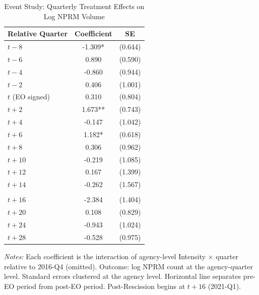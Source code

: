 \begin{table}[t]
\centering
\caption{Event Study: Quarterly Treatment Effects on Log NPRM Volume}
\label{tab:event}
\begin{threeparttable}
\begin{tabular}{lcc}
\hline\hline
Relative Quarter & Coefficient & SE \\
\hline
$t-8$ & -1.309* & (0.644) \\
$t-6$ & 0.890 & (0.590) \\
$t-4$ & -0.860 & (0.944) \\
$t-2$ & 0.406 & (1.001) \\
\hline
$t$ (EO signed) & 0.310 & (0.804) \\
$t+2$ & 1.673** & (0.743) \\
$t+4$ & -0.147 & (1.042) \\
$t+6$ & 1.182* & (0.618) \\
$t+8$ & 0.306 & (0.962) \\
$t+10$ & -0.219 & (1.085) \\
$t+12$ & 0.167 & (1.399) \\
$t+14$ & -0.262 & (1.567) \\
\addlinespace
\multicolumn{3}{l}{\textit{Post-Rescission (2021+):}} \\
$t+16$ & -2.384 & (1.404) \\
$t+20$ & 0.108 & (0.829) \\
$t+24$ & -0.943 & (1.024) \\
$t+28$ & -0.528 & (0.975) \\
\hline\hline
\end{tabular}
\begin{tablenotes}[flushleft]\small
\item \textit{Notes:} Each coefficient is the interaction of agency-level Intensity $\times$ quarter relative to 2016-Q4 (omitted). Outcome: log NPRM count at the agency-quarter level. Standard errors clustered at the agency level. Horizontal line separates pre-EO period from post-EO period. Post-Rescission begins at $t+16$ (2021-Q1).
\end{tablenotes}
\end{threeparttable}
\end{table}

